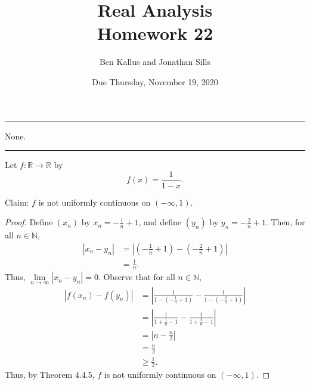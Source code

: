 \documentclass[12pt]{article}
\title{Real Analysis \\ Homework 22}
\author{Ben Kallus and Jonathan Sills}
\date{Due Thursday, November 19, 2020}
\begin{document}
\pagecolor{black}
\color{white}
\maketitle

\hrule
\bigskip

 None.

\bigskip
\hrule
\bigskip

 Let $f: \mathbb R \to \mathbb R$ by $$f(x) = \frac1{1-x}.$$

\medskip
{} Claim: $f$ is not uniformly continuous on $(-\infty, 1)$.
\begin{proof}
    Define $(x_n)$ by $x_n = -\frac1{n} + 1$, and define $(y_n)$ by $y_n = -\frac2{n} + 1$. Then, for all $n \in \mathbb N$,
    \begin{align*}
        |x_n - y_n| &= \left|\left(-\frac1{n} + 1\right) - \left(-\frac2{n} + 1\right)\right| \\
                    &= \frac1n.
    \end{align*}
    Thus, $\lim\limits_{n \to \infty} |x_n - y_n| = 0$. Observe that for all $n \in \mathbb N$,
    \begin{align*}
        |f(x_n) - f(y_n)| &= \left| \frac1{1-\left(-\frac1{n} + 1\right)} - \frac1{1-\left(-\frac2{n} + 1\right)} \right| \\
                          &= \left| \frac1{1 + \frac1{n} - 1} - \frac1{1 + \frac2{n} - 1} \right| \\
                          &= \left| n - \frac n2 \right| \\
                          &= \frac n2 \\
                          &\geq \frac12.
    \end{align*}
    Thus, by Theorem 4.4.5, $f$ is not uniformly continuous on $(-\infty, 1)$.
\end{proof}
\end{document}
